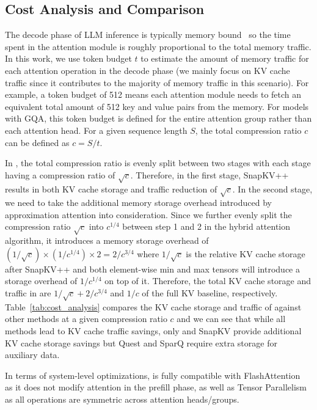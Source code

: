 \subsection{Cost Analysis and Comparison}
The decode phase of LLM inference is typically memory bound~\cite{sparq2024} so the time spent in the attention module is roughly proportional to the total memory traffic. In this work, we use token budget $t$ to estimate the amount of memory traffic for each attention operation in the decode phase (we mainly focus on KV cache traffic since it contributes to the majority of memory traffic in this scenario). For example, a token budget of 512 means each attention module needs to fetch an equivalent total amount of 512 key and value pairs from the memory. For models with GQA, this token budget is defined for the entire attention group rather than each attention head. For a given sequence length $S$, the total compression ratio $c$ can be defined as $c=S/t$. 

In \rocketkv, the total compression ratio is evenly split between two stages with each stage having a compression ratio of $\sqrt{c}$. Therefore, in the first stage, SnapKV++ results in both KV cache storage and traffic reduction of $\sqrt{c}$. In the second stage, we need to take the additional memory storage overhead introduced by approximation attention into consideration. Since we further evenly split the compression ratio $\sqrt{c}$ into $c^{1/4}$ between step 1 and 2 in the hybrid attention algorithm, it introduces a memory storage overhead of $(1/\sqrt{c}) \times (1/c^{1/4}) \times 2=2/c^{3/4}$ where $1/\sqrt{c}$ is the relative KV cache storage after SnapKV++ and both element-wise min and max tensors will introduce a storage overhead of $1/c^{1/4}$ on top of it. Therefore, the total KV cache storage and traffic in \rocketkv are $1/\sqrt{c}+2/c^{3/4}$ and $1/c$ of the full KV baseline, respectively. Table~\ref{tab:cost_analysis} compares the KV cache storage and traffic of \rocketkv against other methods at a given compression ratio $c$ and we can see that while all methods lead to KV cache traffic savings, only \rocketkv and SnapKV provide additional KV cache storage savings but Quest and SparQ require extra storage for auxiliary data.

In terms of system-level optimizations, \rocketkv is fully compatible with FlashAttention~\cite{flashattention2022} as it does not modify attention in the prefill phase, as well as Tensor Parallelism~\cite{megatronlm2019} as all operations are symmetric across attention heads/groups. 

